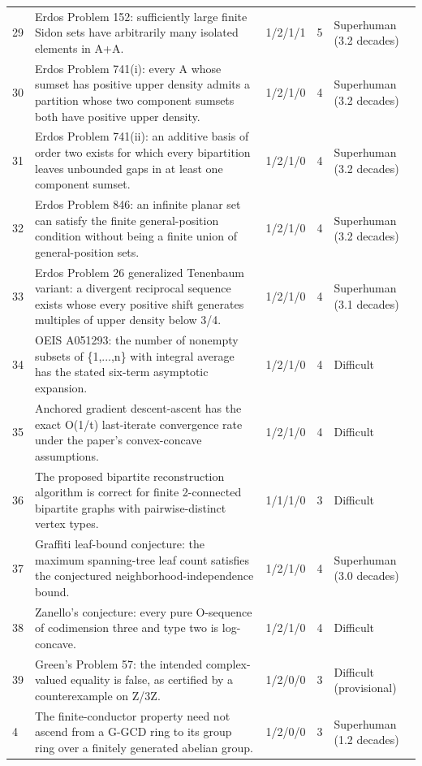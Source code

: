 \begin{landscape}
\begin{longtable}{@{}L{14mm}L{91mm}C{25mm}C{12mm}L{43mm}@{}}
29 & Erdos Problem 152: sufficiently large finite Sidon sets have arbitrarily many isolated elements in A+A. & 1/2/1/1 & 5 & Superhuman (3.2 decades) \\
30 & Erdos Problem 741(i): every A whose sumset has positive upper density admits a partition whose two component sumsets both have positive upper density. & 1/2/1/0 & 4 & Superhuman (3.2 decades) \\
31 & Erdos Problem 741(ii): an additive basis of order two exists for which every bipartition leaves unbounded gaps in at least one component sumset. & 1/2/1/0 & 4 & Superhuman (3.2 decades) \\
32 & Erdos Problem 846: an infinite planar set can satisfy the finite general-position condition without being a finite union of general-position sets. & 1/2/1/0 & 4 & Superhuman (3.2 decades) \\
33 & Erdos Problem 26 generalized Tenenbaum variant: a divergent reciprocal sequence exists whose every positive shift generates multiples of upper density below 3/4. & 1/2/1/0 & 4 & Superhuman (3.1 decades) \\
34 & OEIS A051293: the number of nonempty subsets of \{1,...,n\} with integral average has the stated six-term asymptotic expansion. & 1/2/1/0 & 4 & Difficult \\
35 & Anchored gradient descent-ascent has the exact O(1/t) last-iterate convergence rate under the paper's convex-concave assumptions. & 1/2/1/0 & 4 & Difficult \\
36 & The proposed bipartite reconstruction algorithm is correct for finite 2-connected bipartite graphs with pairwise-distinct vertex types. & 1/1/1/0 & 3 & Difficult \\
37 & Graffiti leaf-bound conjecture: the maximum spanning-tree leaf count satisfies the conjectured neighborhood-independence bound. & 1/2/1/0 & 4 & Superhuman (3.0 decades) \\
38 & Zanello's conjecture: every pure O-sequence of codimension three and type two is log-concave. & 1/2/1/0 & 4 & Difficult \\
39 & Green's Problem 57: the intended complex-valued equality is false, as certified by a counterexample on Z/3Z. & 1/2/0/0 & 3 & Difficult (provisional) \\
4 & The finite-conductor property need not ascend from a G-GCD ring to its group ring over a finitely generated abelian group. & 1/2/0/0 & 3 & Superhuman (1.2 decades) \\

\end{longtable}
\end{landscape}
